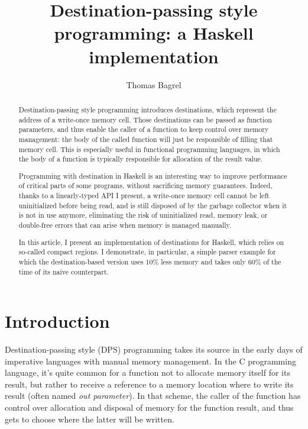\documentclass[english]{jflart}
\title{Destination-passing style programming: a Haskell implementation}
\author[1]{Thomas Bagrel}
\affil[1]{INRIA/LORIA, Vand\oe{}uvre-lès-Nancy, 54500, France}
\affil[1]{Tweag, Paris, 75012, France}
\begin{document}
\maketitle

\begin{abstract}
Destination-passing style programming introduces destinations, which represent the address of a write-once memory cell. Those destinations can be passed as function parameters, and thus enable the caller of a function to keep control over memory management: the body of the called function will just be responsible of filling that memory cell. This is especially useful in functional programming languages, in which the body of a function is typically responsible for allocation of the result value.

Programming with destination in Haskell is an interesting way to improve performance of critical parts of some programs, without sacrificing memory guarantees. Indeed, thanks to a linearly-typed API I present, a write-once memory cell cannot be left uninitialized before being read, and is still disposed of by the garbage collector when it is not in use anymore, eliminating the risk of uninitialized read, memory leak, or double-free errors that can arise when memory is managed manually.

In this article, I present an implementation of destinations for Haskell, which relies on so-called compact regions. I demonstrate, in particular, a simple parser example for which the destination-based version uses 10\% less memory and takes only 60\% of the time of its naive counterpart.
\end{abstract}


\section{Introduction}

Destination-passing style (DPS) programming takes its source in the early days of imperative languages with manual memory management. In the C programming language, it's quite common for a function not to allocate memory itself for its result, but rather to receive a reference to a memory location where to write its result (often named \emph{out parameter}). In that scheme, the caller of the function has control over allocation and disposal of memory for the function result, and thus gets to choose where the latter will be written.
\end{document}
